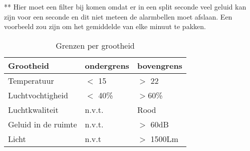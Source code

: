 ** Hier moet een filter bij komen omdat er in een split seconde veel geluid kan zijn voor een seconde en dit niet meteen de alarmbellen moet afslaan. Een voorbeeld zou zijn om het gemiddelde van elke minuut te pakken.

\begin{table}[ht]
    \begin{tabular}{p{3cm}||p{3cm}|p{3cm}}
       Grootheid  & ondergrens & bovengrens \\
       \hline
       Temperatuur  & $<$ 15& $>$ 22 \cite{Temperatuur}\\
       Luchtvochtigheid & $<$ 40\% & $>$60\% \cite{Luchtvochtigheid}\\
       Luchtkwaliteit & n.v.t. & Rood \cite{Gezonde}\\
       Geluid in de ruimte & n.v.t. & $>$ 60dB \cite{Geluidsoverlast}\\
       Licht & n.v.t & $>$ 1500Lm \cite{Lumen}\\
    \end{tabular}
    \caption{Grenzen per grootheid}
    \label{tab:3}
\end{table}